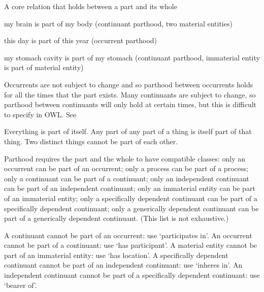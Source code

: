 \documentclass[letterpaper,10pt,english]{sphinxmanual}
\begin{document}
\begin{sphinxShadowBox}

\sphinxAtStartPar
{\hyperref[\detokenize{doc-RO_0002131::doc}]{}}
\end{sphinxShadowBox}

\begin{sphinxShadowBox}

\sphinxAtStartPar
A core relation that holds between a part and its whole
\end{sphinxShadowBox}

\begin{sphinxShadowBox}

\sphinxAtStartPar
my brain is part of my body (continuant parthood, two material entities)

\sphinxAtStartPar
this day is part of this year (occurrent parthood)

\sphinxAtStartPar
my stomach cavity is part of my stomach (continuant parthood, immaterial entity is part of material entity)
\end{sphinxShadowBox}

\begin{sphinxShadowBox}

\sphinxAtStartPar
Occurrents are not subject to change and so parthood between occurrents holds for all the times that the part exists. Many continuants are subject to change, so parthood between continuants will only hold at certain times, but this is difficult to specify in OWL. See 

\sphinxAtStartPar
Everything is part of itself. Any part of any part of a thing is itself part of that thing. Two distinct things cannot be part of each other.

\sphinxAtStartPar
Parthood requires the part and the whole to have compatible classes: only an occurrent can be part of an occurrent; only a process can be part of a process; only a continuant can be part of a continuant; only an independent continuant can be part of an independent continuant; only an immaterial entity can be part of an immaterial entity; only a specifically dependent continuant can be part of a specifically dependent continuant; only a generically dependent continuant can be part of a generically dependent continuant. (This list is not exhaustive.)

\sphinxAtStartPar
A continuant cannot be part of an occurrent: use ‘participates in’. An occurrent cannot be part of a continuant: use ‘has participant’. A material entity cannot be part of an immaterial entity: use ‘has location’. A specifically dependent continuant cannot be part of an independent continuant: use ‘inheres in’. An independent continuant cannot be part of a specifically dependent continuant: use ‘bearer of’.
\end{sphinxShadowBox}
\end{document}
